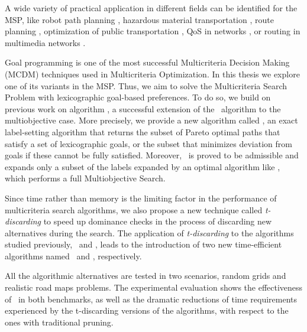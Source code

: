 A wide variety of practical application in different fields can be identified for the MSP, like robot path planning \citep{Wu2011}, hazardous material transportation \citep{caramiaetal2010}, route planning  \citep{Jozefowiez2008}, optimization of public transportation \citep{Raith2009}, QoS in networks \citep{craveirinha2009}, or routing in multimedia networks \citep{climacoetal2003}.

Goal programming is one of the most successful Multicriteria Decision Making (MCDM) techniques used in Multicriteria Optimization. In this thesis we explore one of its variants in the MSP. Thus, we aim to solve the Multicriteria Search Problem with lexicographic goal-based preferences. To do so, we build on previous work on algorithm \namoa, a successful extension of the \astar \ algorithm to the multiobjective case. More precisely, we provide a new algorithm called \lexgo, an exact label-setting algorithm that returns the subset of Pareto optimal paths that satisfy a set of lexicographic goals, or the subset that minimizes deviation from goals if these cannot be fully satisfied. Moreover, \lexgo \ is proved to be admissible and expands only a subset of the labels expanded by an optimal algorithm like \namoa, which performs a full Multiobjective Search.

Since time rather than memory is the limiting factor in the performance of  multicriteria search algorithms, we also propose a new technique called \emph{t-discarding} to speed up dominance checks in the process of discarding new alternatives during the search. The application of \emph{t-discarding} to the algorithms studied previously, \namoa \ and \lexgo, leads to the introduction of two new time-efficient algorithms named \namoate \ and \lexgote, respectively.

All the algorithmic alternatives are tested in two scenarios, random grids and realistic road maps problems. The experimental evaluation shows the effectiveness of \lexgo \ in both benchmarks, as well as the dramatic reductions of time requirements experienced by the t-discarding versions of the algorithms, with respect to the ones with traditional pruning.

\endinput

